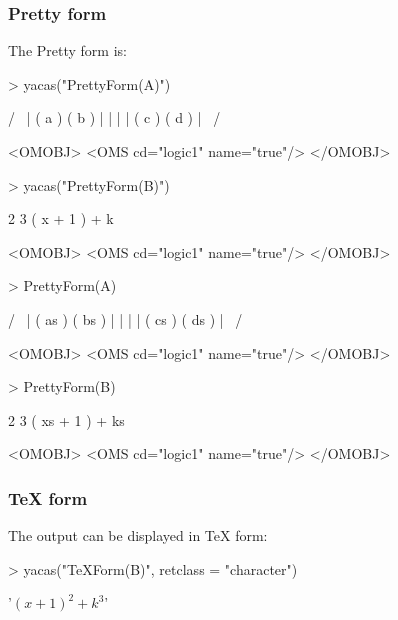 \documentclass[10pt]{article}
\begin{document}
\subsubsection{Pretty form}
The Pretty form is:
\begin{Schunk}
\begin{Sinput}
> yacas("PrettyForm(A)")
\end{Sinput}
\begin{Soutput}
/              \
| ( a ) ( b )  |
|              |
| ( c ) ( d )  |
\              /

<OMOBJ>
  <OMS cd="logic1" name="true"/>
</OMOBJ>
\end{Soutput}
\begin{Sinput}
> yacas("PrettyForm(B)")
\end{Sinput}
\begin{Soutput}
         2    3
( x + 1 )  + k 

<OMOBJ>
  <OMS cd="logic1" name="true"/>
</OMOBJ>
\end{Soutput}
\end{Schunk}

\begin{Schunk}
\begin{Sinput}
> PrettyForm(A)
\end{Sinput}
\begin{Soutput}
/                \
| ( as ) ( bs )  |
|                |
| ( cs ) ( ds )  |
\                /

<OMOBJ>
  <OMS cd="logic1" name="true"/>
</OMOBJ>
\end{Soutput}
\begin{Sinput}
> PrettyForm(B)
\end{Sinput}
\begin{Soutput}
          2     3
( xs + 1 )  + ks 

<OMOBJ>
  <OMS cd="logic1" name="true"/>
</OMOBJ>
\end{Soutput}
\end{Schunk}



\subsubsection{TeX form}

The output can be displayed in TeX form:
\begin{Schunk}
\begin{Sinput}
> yacas("TeXForm(B)", retclass = "character")
\end{Sinput}
\begin{Soutput}
'$\left( x + 1\right)  ^{2} + k ^{3}$'
\end{Soutput}
\end{Schunk}
\end{document}
